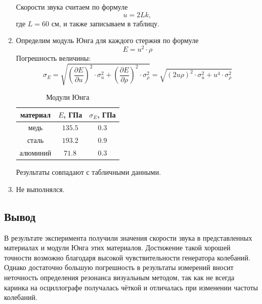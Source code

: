 \documentclass[a4paper,12pt]{article}
\begin{document}
\begin{enumerate}
		Скорости звука считаем по формуле 
		$$
		u = 2Lk,
		$$
		где $L = 60$ см, и также записываем в таблицу.

		\item Определим модуль Юнга для каждого стержня по формуле
		$$
		E = u^2\cdot\rho
		$$
		Погрешность величины:
		$$
		\sigma_{E} = \sqrt{\left(\frac{\partial{E}}{\partial{u}}\right)^2\cdot\sigma_u^2 + \left(\frac{\partial{E}}{\partial{\rho}}\right)^2\cdot \sigma_{\rho}^2} = \sqrt{(2u\rho)^2\cdot \sigma_u^2 + u^4\cdot \sigma_{\rho}^2}
		$$
		\begin{table}[h]
			\centering
			\begin{tabular}{|c|c|c|} \hline
				материал & $E$, ГПа & $\sigma_E$, ГПа \\ \hline
				медь & $135.5$ & $0.3$ \\ \hline
				сталь & $193.2$ & $0.9$ \\ \hline
				алюминий & $71.8$ & $0.3$ \\ \hline
			\end{tabular}
			\caption{Модули Юнга}
			\label{table4}
		\end{table}
		Результаты совпадают с табличными данными.

		\item Не выполнялся.
	\end{enumerate}
\subsection*{Вывод}
В результате эксперимента получили значения скорости звука в представленных материалах и модули Юнга этих материалов.	
Достижение такой хорошей точности возможно благодаря высокой чувствительности генератора колебаний. Однако достаточно большую погрешность в результаты измерений вносит неточность определения резонанса визуальным методом, так как не всегда каринка на осциллографе получалась чёткой и отличалась при изменении частоты колебаний.	
\end{document}
